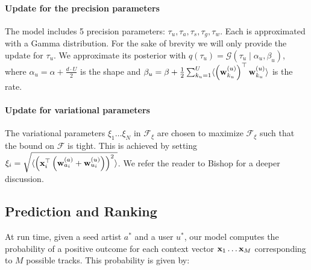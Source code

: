 \paragraph{Update for the precision parameters}
\noindent The model includes 5 precision parameters: $\tau_u, \tau_a, \tau_s, \tau_g, \tau_w$. Each is approximated with a Gamma distribution. For the sake of brevity we will only provide the update for $\tau_u$. We approximate its posterior with $q(\tau_u)= \mathcal{G}(\tau_u\mid \alpha_u, \beta_u)$, where $\alpha_u=\alpha+\frac{d \cdot U}{2}$ is the shape and $\beta_u=\beta+\frac{1}{2}\sum_{k_u=1}^U\langle \left(\mathbf{w}^{(u)}_{k_u}\right)^{\top} \mathbf{w}^{(u)}_{k_u}\rangle$ is the rate.  


\paragraph{Update for variational parameters}
\noindent The variational parameters $\xi_1\dots \xi_N$ in $\mathcal{F}_{\xi}$ are chosen to maximize $\mathcal{F}_{\xi}$ such that the bound on $\mathcal{F}$ is tight. This is achieved by setting 
$\xi_i= \sqrt{ \langle  \left(\mathbf{x}_i^\top \left( \mathbf{w}^{(a)}_{a_i}+\mathbf{w}^{(u)}_{u_i} \right) \right)^2 \rangle}$. We refer the reader to Bishop \cite{Bishop} for a deeper discussion.

\subsection{Prediction and Ranking}
At run time, given a seed artist $a^*$ and a user $u^*$, our model  computes the probability of a positive outcome for each context vector $\mathbf{x}_1 \dots \mathbf{x}_M$ corresponding to $M$ possible tracks. This probability is given by:

